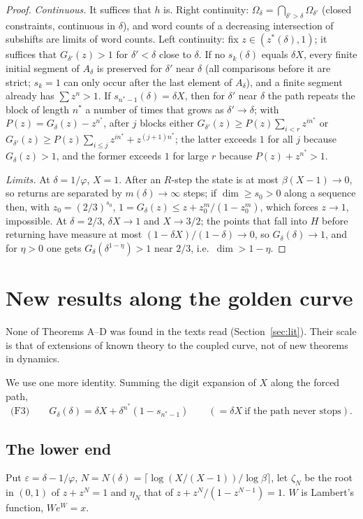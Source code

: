 \documentclass[11pt]{amsart}
\theoremstyle{remark}
\begin{document}
\begin{proof}
\emph{Continuous.} It suffices that $h$ is. Right continuity: $\Omega_\delta=\bigcap_{\delta'>\delta}\Omega_{\delta'}$ (closed constraints, continuous in $\delta$), and word counts of a decreasing intersection of subshifts are limits of word counts. Left continuity: fix $z\in(z^*(\delta),1)$; it suffices that $G_{\delta'}(z)>1$ for $\delta'<\delta$ close to $\delta$. If no $s_k(\delta)$ equals $\delta X$, every finite initial segment of $A_\delta$ is preserved for $\delta'$ near $\delta$ (all comparisons before it are strict; $s_k=1$ can only occur after the last element of $A_\delta$), and a finite segment already has $\sum z^n>1$. If $s_{n^*-1}(\delta)=\delta X$, then for $\delta'$ near $\delta$ the path repeats the block of length $n^*$ a number of times that grows as $\delta'\to\delta$; with $P(z)=G_\delta(z)-z^{n^*}$, after $j$ blocks either $G_{\delta'}(z)\ge P(z)\sum_{i<r}z^{in^*}$ or $G_{\delta'}(z)\ge P(z)\sum_{i\le j}z^{in^*}+z^{(j+1)n^*}$; the latter exceeds $1$ for all $j$ because $G_\delta(z)>1$, and the former exceeds $1$ for large $r$ because $P(z)+z^{n^*}>1$.

\emph{Limits.} At $\delta=1/\varphi$, $X=1$. After an $R$-step the state is at most $\beta(X-1)\to0$, so returns are separated by $m(\delta)\to\infty$ steps; if $\dim\ge s_0>0$ along a sequence then, with $z_0=(2/3)^{s_0}$, $1=G_\delta(z)\le z+z_0^m/(1-z_0^m)$, which forces $z\to1$, impossible. At $\delta=2/3$, $\delta X\to1$ and $X\to3/2$; the points that fall into $H$ before returning have measure at most $(1-\delta X)/(1-\delta)\to0$, so $G_\delta(\delta)\to1$, and for $\eta>0$ one gets $G_\delta(\delta^{1-\eta})>1$ near $2/3$, i.e.\ $\dim>1-\eta$.
\end{proof}

\section{New results along the golden curve}\label{sec:new}

None of Theorems A--D was found in the texts read (Section~\ref{sec:lit}). Their scale is that of extensions of known theory to the coupled curve, not of new theorems in dynamics.

We use one more identity. Summing the digit expansion of $X$ along the forced path,
\[
\text{(F3)}\qquad G_\delta(\delta)=\delta X+\delta^{n^*}(1-s_{n^*-1})\qquad(=\delta X\ \text{if the path never stops}).
\]

\subsection{The lower end}
Put $\varepsilon=\delta-1/\varphi$, $N=N(\delta)=\lceil\log(X/(X-1))/\log\beta\rceil$, let $\zeta_N$ be the root in $(0,1)$ of $z+z^N=1$ and $\eta_N$ that of $z+z^N/(1-z^{N-1})=1$. $W$ is Lambert's function, $We^W=x$.
\end{document}
